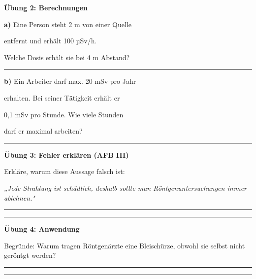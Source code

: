 \documentclass[10pt, a4paper]{article}
\newcommand{\fachfarbe}{physik}
\newcommand{\luecke}[1]{\rule{#1}{0.4pt}}
\newcommand{\abschnitt}[1]{%
    \vspace{8pt}\noindent\textbf{\textcolor{\fachfarbe}{#1}}\vspace{4pt}
}
\begin{document}
\begin{multicols}{2}
\abschnitt{Übung 2: Berechnungen}

\textbf{a)} Eine Person steht 2 m von einer Quelle

entfernt und erhält 100 µSv/h.

Welche Dosis erhält sie bei 4 m Abstand?

\vspace{4pt}
\luecke{5.8cm}

\vspace{6pt}

\textbf{b)} Ein Arbeiter darf max. 20 mSv pro Jahr

erhalten. Bei seiner Tätigkeit erhält er

0,1 mSv pro Stunde. Wie viele Stunden

darf er maximal arbeiten?

\vspace{4pt}
\luecke{5.8cm}

\vspace{8pt}


\abschnitt{Übung 3: Fehler erklären (AFB III)}

\begin{fehlerbox}
Erkläre, warum diese Aussage falsch ist:

\vspace{4pt}

\textit{„Jede Strahlung ist schädlich, deshalb sollte man Röntgenuntersuchungen immer ablehnen."}

\vspace{4pt}
\luecke{5.8cm}

\vspace{4pt}
\luecke{5.8cm}
\end{fehlerbox}

\vspace{8pt}


\abschnitt{Übung 4: Anwendung}

Begründe: Warum tragen Röntgenärzte eine Bleischürze, obwohl sie selbst nicht geröntgt werden?

\vspace{4pt}
\luecke{5.8cm}

\vspace{4pt}
\luecke{5.8cm}

\end{multicols}
\end{document}
